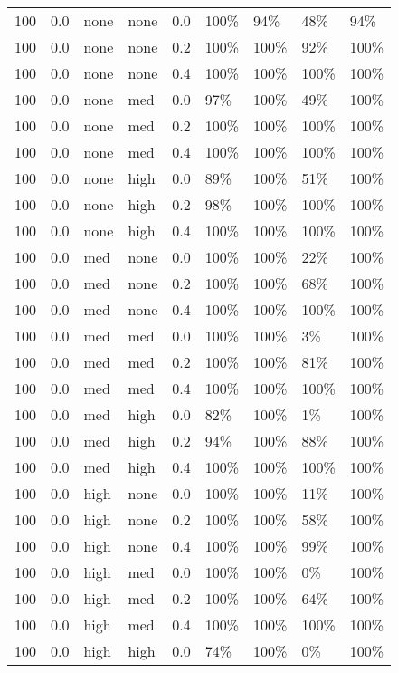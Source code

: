 \begin{longtable}{rrllrllll}
  100 & 0.0 & none & none & 0.0 & 100\% & 94\% & 48\% & 94\% \\ 
  100 & 0.0 & none & none & 0.2 & 100\% & 100\% & 92\% & 100\% \\ 
  100 & 0.0 & none & none & 0.4 & 100\% & 100\% & 100\% & 100\% \\ 
  100 & 0.0 & none & med & 0.0 & 97\% & 100\% & 49\% & 100\% \\ 
  100 & 0.0 & none & med & 0.2 & 100\% & 100\% & 100\% & 100\% \\ 
  100 & 0.0 & none & med & 0.4 & 100\% & 100\% & 100\% & 100\% \\ 
  100 & 0.0 & none & high & 0.0 & 89\% & 100\% & 51\% & 100\% \\ 
  100 & 0.0 & none & high & 0.2 & 98\% & 100\% & 100\% & 100\% \\ 
  100 & 0.0 & none & high & 0.4 & 100\% & 100\% & 100\% & 100\% \\ 
  100 & 0.0 & med & none & 0.0 & 100\% & 100\% & 22\% & 100\% \\ 
  100 & 0.0 & med & none & 0.2 & 100\% & 100\% & 68\% & 100\% \\ 
  100 & 0.0 & med & none & 0.4 & 100\% & 100\% & 100\% & 100\% \\ 
  100 & 0.0 & med & med & 0.0 & 100\% & 100\% & 3\% & 100\% \\ 
  100 & 0.0 & med & med & 0.2 & 100\% & 100\% & 81\% & 100\% \\ 
  100 & 0.0 & med & med & 0.4 & 100\% & 100\% & 100\% & 100\% \\ 
  100 & 0.0 & med & high & 0.0 & 82\% & 100\% & 1\% & 100\% \\ 
  100 & 0.0 & med & high & 0.2 & 94\% & 100\% & 88\% & 100\% \\ 
  100 & 0.0 & med & high & 0.4 & 100\% & 100\% & 100\% & 100\% \\ 
  100 & 0.0 & high & none & 0.0 & 100\% & 100\% & 11\% & 100\% \\ 
  100 & 0.0 & high & none & 0.2 & 100\% & 100\% & 58\% & 100\% \\ 
  100 & 0.0 & high & none & 0.4 & 100\% & 100\% & 99\% & 100\% \\ 
  100 & 0.0 & high & med & 0.0 & 100\% & 100\% & 0\% & 100\% \\ 
  100 & 0.0 & high & med & 0.2 & 100\% & 100\% & 64\% & 100\% \\ 
  100 & 0.0 & high & med & 0.4 & 100\% & 100\% & 100\% & 100\% \\ 
  100 & 0.0 & high & high & 0.0 & 74\% & 100\% & 0\% & 100\% \\ 

\end{longtable}
